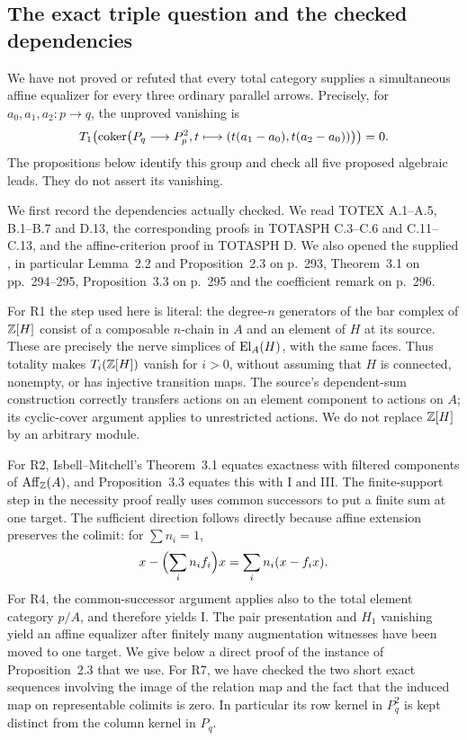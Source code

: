 \subsection{The exact triple question and the checked dependencies}

\begin{unresolved}\label{B:triple}
We have not proved or refuted that every total category supplies a simultaneous affine equalizer for every three ordinary parallel arrows. Precisely, for $a_0,a_1,a_2:p\to q$, the unproved vanishing is
\[
 T_1\!\left(\operatorname{coker}\bigl(P_q\longrightarrow P_p^2,
 t\longmapsto(t(a_1-a_0),t(a_2-a_0))\bigr)\right)=0.
\]
The propositions below identify this group and check all five proposed algebraic leads. They do not assert its vanishing.
\end{unresolved}

We first record the dependencies actually checked. We read TOTEX A.1--A.5, B.1--B.7 and D.13, the corresponding proofs in TOTASPH C.3--C.6 and C.11--C.13, and the affine-criterion proof in TOTASPH D. We also opened the supplied \citet{IsbellMitchell1976}, in particular Lemma~2.2 and Proposition~2.3 on p.~293, Theorem~3.1 on pp.~294--295, Proposition~3.3 on p.~295 and the coefficient remark on p.~296.

For R1 the step used here is literal: the degree-$n$ generators of the bar complex of $\mathbb Z[H]$ consist of a composable $n$-chain in $A$ and an element of $H$ at its source. These are precisely the nerve simplices of $\operatorname{El}_A(H)$, with the same faces. Thus totality makes $T_i(\mathbb Z[H])$ vanish for $i>0$, without assuming that $H$ is connected, nonempty, or has injective transition maps. The source's dependent-sum construction correctly transfers actions on an element component to actions on $A$; its cyclic-cover argument applies to unrestricted actions. We do not replace $\mathbb Z[H]$ by an arbitrary module.

For R2, Isbell--Mitchell's Theorem~3.1 equates exactness with filtered components of $\operatorname{Aff}_\mathbb Z(A)$, and Proposition~3.3 equates this with I and III. The finite-support step in the necessity proof really uses common successors to put a finite sum at one target. The sufficient direction follows directly because affine extension preserves the colimit: for $\sum n_i=1$,
\[
 x-\Bigl(\sum_i n_if_i\Bigr)x=\sum_i n_i(x-f_ix).
\]
For R4, the common-successor argument applies also to the total element category $p/A$, and therefore yields I. The pair presentation and $H_1$ vanishing yield an affine equalizer after finitely many augmentation witnesses have been moved to one target. We give below a direct proof of the instance of Proposition~2.3 that we use. For R7, we have checked the two short exact sequences involving the image of the relation map and the fact that the induced map on representable colimits is zero. In particular its row kernel in $P_q^2$ is kept distinct from the column kernel in $P_q$.

